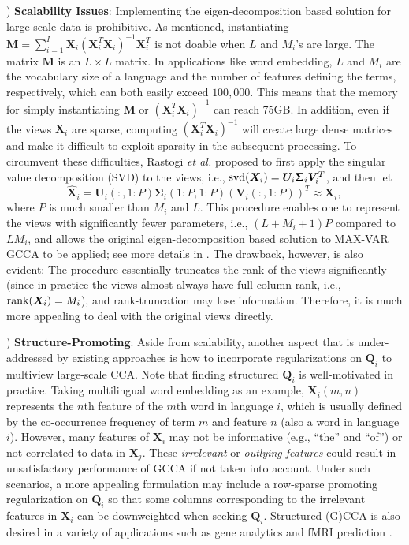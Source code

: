 \documentclass[10pt,journal]{IEEEtran}
\newcommand{\Q}{\boldsymbol{Q}}
\newcommand{\X}{\boldsymbol{X}}
\begin{document}
) {\bf Scalability Issues}:
Implementing the eigen-decomposition based solution for large-scale data is prohibitive. 
As mentioned, instantiating ${\bm M} = \sum_{i=1}^I{\bm X}_i({\bm X}_i^T{\bm X}_i)^{-1}{\bm X}_i^T$ is not doable when $L$ and $M_i$'s are large. The matrix ${\bm M}$ is an $L\times L$ matrix. In applications like word embedding, $L$ and $M_i$ are the vocabulary size of a language and the number of features defining the terms, respectively, which can both easily exceed $100,000$. This means that the memory for simply instantiating ${\bm M}$ or $({\bm X}_i^T{\bm X}_i)^{-1}$ can reach 75GB.	
In addition, even if the views ${\bm X}_i$ are sparse, computing $({\bm X}_i^T{\bm X}_i)^{-1}$ will create large dense matrices and make it difficult to exploit sparsity in the subsequent processing.
To circumvent these difficulties, Rastogi \emph{et al.} \cite{rastogimultiview} proposed to first apply the singular value decomposition (SVD) to the views, i.e., ${\rm svd}({\bm X}_i)={\bm U}_i{\bm \Sigma}_i{\bm V}_i^T$, and then let 
	\[\hat{\bm X}_i = {\bm U}_i(:,1:P){\bm \Sigma}_i(1:P,1:P)({\bm V}_i(:,1:P))^T \approx {\bm X}_i,\]
where $P$ is much smaller than $M_i$ and $L$.
This procedure enables one to represent the views with significantly fewer parameters, i.e., $(L+M_i+1)P$ compared to $LM_i$,
and allows the original eigen-decomposition based solution to MAX-VAR GCCA to be applied; see more details in \cite{rastogimultiview}.	The drawback, however, is also evident: The procedure essentially truncates the rank of the views significantly (since in practice the views almost always have full column-rank, i.e., ${\rm rank}({\bm X}_i)=M_i$), and rank-truncation may lose information. Therefore, it is much more appealing to deal with the original views directly. 

) {\bf Structure-Promoting}:
Aside from scalability, another aspect that is under-addressed by existing approaches is how to incorporate regularizations on $\Q_i$ to multiview large-scale CCA. Note that finding structured $\Q_i$ is well-motivated in practice. Taking multilingual word embedding as an example, $\X_i(m,n)$ represents
the $n$th feature of the $m$th word in language $i$, which is usually defined by the co-occurrence frequency of term $m$ and feature $n$ (also a word in language $i$).
However, many features of $\X_i$ may not be informative (e.g., ``the'' and ``of'') or not correlated to data in $\X_j$.
These \textit{irrelevant} or \emph{outlying features} could result in unsatisfactory performance of GCCA if  not taken into account.
Under such scenarios, a more appealing formulation may include a row-sparse promoting regularization on ${\bm Q}_i$ so that some columns corresponding to the irrelevant features in $\X_i$ can be downweighted when seeking $\Q_i$.
Structured (G)CCA is also desired in a variety of applications such as gene analytics and fMRI prediction \cite{rustandi2009integrating,mitchell2008predicting,witten2009penalized,chen2012structured,witten2009extensions}.
\end{document}
